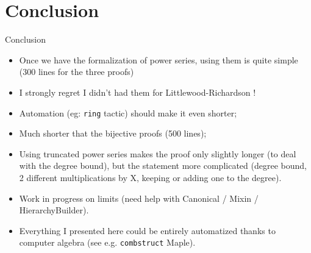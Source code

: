 \documentclass[compress,11pt]{beamer}
\begin{document}
\section{Conclusion}

\begin{frame}{Conclusion}

  \begin{itemize}
  \item Once we have the formalization of power series, using them is quite
    simple (300 lines for the three proofs)
  \item I strongly regret I didn't had them for Littlewood-Richardson !
  \item Automation (eg: \texttt{ring} tactic) should make it even shorter;
  \item Much shorter that the bijective proofs (500 lines);
  \item Using truncated power series makes the proof only slightly longer (to
    deal with the degree bound), but the statement more complicated (degree
    bound, 2 different multiplications by X, keeping or adding one to the
    degree).
  \item Work in progress on limits (need help with
    Canonical / Mixin / HierarchyBuilder).
  \item Everything I presented here could be entirely automatized thanks to
    computer algebra (see e.g. \texttt{combstruct} Maple\textcopyright).
  \end{itemize}
\end{frame}
\end{document}
